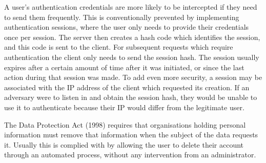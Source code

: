 		A user's authentication credentials are more likely to be intercepted 
		if they need to send them frequently. This is conventionally prevented 
		by implementing authentication sessions, where the user only needs to 
		provide their credentials once per session. The server then creates a 
		hash code which identifies the session, and this code is sent to the 
		client. For subsequent requests which require authentication the 
		client only needs to send the session hash. The session usually 
		expires after a certain amount of time after it was initiated, or 
		since the last action during that session was made. To add even more 
		security, a session may be associated with the IP address of the 
		client which requested its creation. If an adversary were to listen in 
		and obtain the session hash, they would be unable to use it to 
		authenticate because their IP would differ from the legitimate user.

		The Data Protection Act (1998) requires that organisations holding 
		personal information must remove that information when the subject of 
		the data requests it\cite{dpa1998}. Usually this is complied with by 
		allowing the user to delete their account through an automated 
		process, without any intervention from an administrator.
